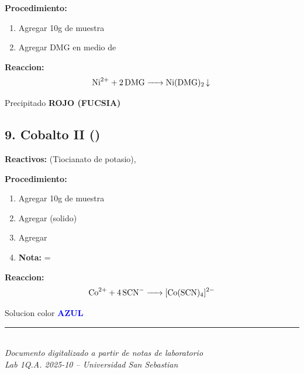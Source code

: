 \documentclass[11pt,a4paper]{article}
\begin{document}
\textbf{Procedimiento:}
\begin{enumerate}[leftmargin=*]
    \item Agregar 10g de muestra
    \item Agregar DMG en medio de 
\end{enumerate}

\begin{reaccionbox}
\textbf{Reaccion:}
\begin{equation*}
\ce{Ni^{2+} + 2DMG -> Ni(DMG)2 v}
\end{equation*}
\end{reaccionbox}

\begin{resultado}
Precipitado \textbf{\textcolor{red!70!black}{ROJO (FUCSIA)}}
\end{resultado}

\subsection{9. Cobalto II ()}

\textbf{Reactivos:}  (Tiocianato de potasio), 

\textbf{Procedimiento:}
\begin{enumerate}[leftmargin=*]
    \item Agregar 10g de muestra
    \item Agregar  (solido)
    \item Agregar 
    \item \textbf{Nota:}  = 
\end{enumerate}

\begin{reaccionbox}
\textbf{Reaccion:}
\begin{equation*}
\ce{Co^{2+} + 4SCN^- -> [Co(SCN)4]^{2-}}
\end{equation*}
\end{reaccionbox}

\begin{resultado}
Solucion color \textbf{\textcolor{blue}{AZUL}}
\end{resultado}

\vfill

\begin{center}
\rule{0.5\textwidth}{0.5pt}\\[0.3cm]
\textit{Documento digitalizado a partir de notas de laboratorio}\\
\textit{Lab 1Q.A. 2025-10 -- Universidad San Sebastian}
\end{center}
\end{document}

